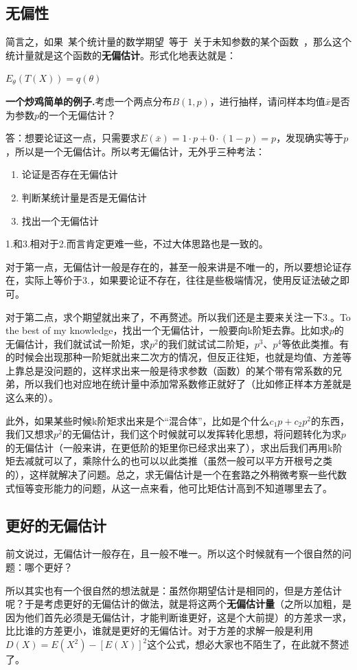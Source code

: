 \documentclass[10pt, a4paper]{article}
\begin{document}
\subsection{无偏性}
简言之，如果~某个统计量的数学期望~等于~关于未知参数的某个函数~，那么这个统计量就是这个函数的\textbf{无偏估计}。形式化地表达就是：
\begin{center}
    $E_\theta (T(X))=q(\theta)$
\end{center} 
\par
\textbf{一个炒鸡简单的例子.}考虑一个两点分布$B(1,p)$，进行抽样，请问样本均值$\bar x$是否为参数$p$的一个无偏估计？\\\par
答：想要论证这一点，只需要求$E(\bar x)=1·p+0·(1-p)=p$，发现确实等于$p$，所以是一个无偏估计。所以考无偏估计，无外乎三种考法：
\begin{enumerate}
    \item 论证是否存在无偏估计
    \item 判断某统计量是否是无偏估计
    \item 找出一个无偏估计
\end{enumerate}\par
1.和3.相对于2.而言肯定更难一些，不过大体思路也是一致的。\par
对于第一点，无偏估计一般是存在的，甚至一般来讲是不唯一的，所以要想论证存在，实际上等价于3.，如果要论证不存在，往往是些极端情况，使用反证法破之即可。\par
对于第二点，求个期望就出来了，不再赘述。所以我们还是主要来关注一下3.。To the best of my knowledge，找出一个无偏估计，一般要向k阶矩去靠。比如求$p$的无偏估计，我们就试试一阶矩，求$p^2$的我们就试试二阶矩，$p^3$、$p^4$等依此类推。有的时候会出现那种一阶矩就出来二次方的情况，但反正往矩，也就是均值、方差等上靠总是没问题的，这样求出来一般是待求参数（函数）的某个带有常系数的兄弟，所以我们也对应地在统计量中添加常系数修正就好了（比如修正样本方差就是这么来的）。\par
此外，如果某些时候k阶矩求出来是个“混合体”，比如是个什么$c_1 p+c_2 p^2$的东西，我们又想求$p^2$的无偏估计，我们这个时候就可以发挥转化思想，将问题转化为求$p$的无偏估计（一般来讲，在更低阶的矩里你已经求出来了），求出后我们再用k阶矩去减就可以了，乘除什么的也可以以此类推（虽然一般可以平方开根号之类的），这样就解决了问题。总之，求无偏估计是一个在套路之外稍微考察一些代数式恒等变形能力的问题，从这一点来看，他可比矩估计高到不知道哪里去了。
\subsection{更好的无偏估计}
前文说过，无偏估计一般存在，且一般不唯一。所以这个时候就有一个很自然的问题：哪个更好？\par
所以其实也有一个很自然的想法就是：虽然你期望估计是相同的，但是方差估计呢？于是考虑更好的无偏估计的做法，就是将这两个\textbf{无偏估计量}（之所以加粗，是因为他们首先必须是无偏估计，才能判断谁更好，这是个大前提）的方差求一求，比比谁的方差更小，谁就是更好的无偏估计。对于方差的求解一般是利用$D(X)=E(X^2)-[E(X)]^2$这个公式，想必大家也不陌生了，在此就不赘述了。
\end{document}
